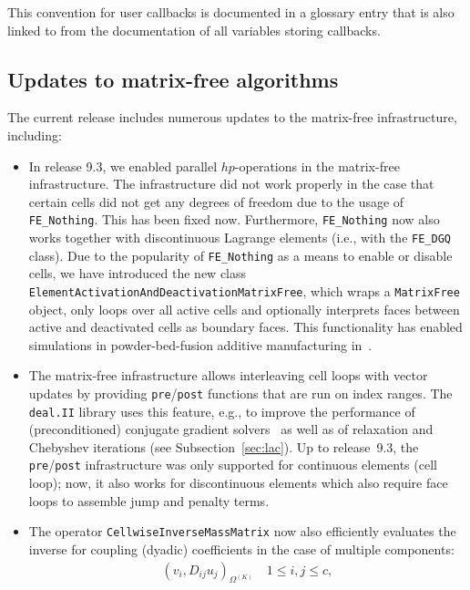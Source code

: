 \documentclass{ansarticle-preprint}
\newcommand{\specialword}[1]{\texttt{#1}}
\newcommand{\dealii}{{\specialword{deal.II}}\xspace}
\begin{document}
This convention for user callbacks is documented in a glossary entry
that is also linked to from the documentation of all variables storing
callbacks.


\subsection{Updates to matrix-free algorithms}\label{sec:mf}

The current release includes numerous updates to the matrix-free
infrastructure, including:
\begin{itemize}
\item In release 9.3, we enabled parallel $hp$-operations in the matrix-free infrastructure.
The infrastructure did not work properly in the case that certain cells
did not get any degrees of freedom due to the usage of \texttt{FE\_Nothing}. This has been
fixed now. Furthermore, \texttt{FE\_Nothing} now also works together
with discontinuous Lagrange elements (i.e., with the \texttt{FE\_DGQ} class). Due to the popularity of \texttt{FE\_Nothing} as a means to enable
or disable cells, we have introduced the new class
\texttt{ElementActivationAndDeactivationMatrixFree}, which wraps a \texttt{MatrixFree} object, only loops over all
active cells and optionally interprets faces between active and deactivated cells
as boundary faces. This functionality has enabled simulations in powder-bed-fusion additive
manufacturing in~\cite{proell2023highly}.
\item The matrix-free infrastructure allows interleaving cell loops with vector updates
  by providing \texttt{pre}/\texttt{post} functions that are run on index ranges.  The \dealii
  library uses this feature, e.g., to improve the performance of (preconditioned)
conjugate gradient solvers~\cite{kronbichler2022cg} as well as of relaxation and Chebyshev iterations (see Subsection~\ref{sec:lac}).
Up to release~9.3, the \texttt{pre}/\texttt{post} infrastructure was only supported for
continuous elements (cell loop); now, it also works for discontinuous
elements which also require face loops to assemble jump and penalty terms.
\item The operator \texttt{CellwiseInverseMassMatrix} now also efficiently
evaluates the inverse for coupling (dyadic) coefficients in the case of multiple
components:
\begin{align*}
\left(v_i, D_{ij} u_j  \right)_{\Omega^{(K)}}
\quad  1\le i,j \le c,
\end{align*}

\end{itemize}
\end{document}
